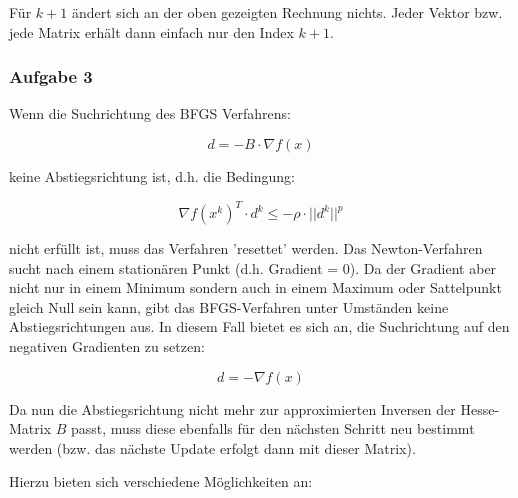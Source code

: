 \documentclass[a4paper, 12pt]{report}
\begin{document}
Für $k + 1$ ändert sich an der oben gezeigten Rechnung nichts. Jeder Vektor bzw. jede Matrix erhält dann einfach nur den Index $k + 1$.

\subsubsection{Aufgabe 3}

Wenn die Suchrichtung des BFGS Verfahrens:

$$d = -B\cdot \nabla f(x) $$

keine Abstiegsrichtung ist, d.h. die Bedingung:

$$ \nabla f(x^k)^T \cdot d^k \leq -\rho \cdot ||d^k||^p $$

nicht erfüllt ist, muss das Verfahren 'resettet' werden. Das Newton-Verfahren sucht nach einem stationären Punkt (d.h. Gradient = 0).
Da der Gradient aber nicht nur in einem Minimum sondern auch in einem Maximum oder Sattelpunkt gleich Null sein kann,
gibt das BFGS-Verfahren unter Umständen keine Abstiegsrichtungen aus. In diesem Fall bietet es sich an, die Suchrichtung auf den
negativen Gradienten zu setzen:

$$d = -\nabla f(x)$$

Da nun die Abstiegsrichtung nicht mehr zur approximierten Inversen der Hesse-Matrix $B$ passt, muss diese ebenfalls für
den nächsten Schritt neu bestimmt werden (bzw. das nächste Update erfolgt dann mit dieser Matrix).\par
Hierzu bieten sich verschiedene Möglichkeiten an:
\end{document}
